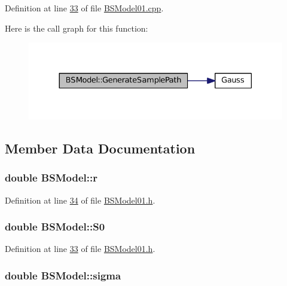 Definition at line \hyperlink{BSModel01_8cpp_source_l00033}{33} of file \hyperlink{BSModel01_8cpp_source}{B\+S\+Model01.\+cpp}.



Here is the call graph for this function\+:\nopagebreak
\begin{figure}[H]
\begin{center}
\leavevmode
\includegraphics[width=330pt]{classBSModel_aad0f0d6d1b9df4d76d03bd0b477e1347_cgraph}
\end{center}
\end{figure}




\subsection{Member Data Documentation}
\hypertarget{classBSModel_add3230c0df8e47623116b439598c0de3}{
\subsubsection[{r}]{\setlength{\rightskip}{0pt plus 5cm}double B\+S\+Model\+::r}}\label{classBSModel_add3230c0df8e47623116b439598c0de3}


Definition at line \hyperlink{BSModel01_8h_source_l00034}{34} of file \hyperlink{BSModel01_8h_source}{B\+S\+Model01.\+h}.

\hypertarget{classBSModel_a2b37a14d9aaab033d676dd16381f7f19}{
\subsubsection[{S0}]{\setlength{\rightskip}{0pt plus 5cm}double B\+S\+Model\+::\+S0}}\label{classBSModel_a2b37a14d9aaab033d676dd16381f7f19}


Definition at line \hyperlink{BSModel01_8h_source_l00033}{33} of file \hyperlink{BSModel01_8h_source}{B\+S\+Model01.\+h}.

\hypertarget{classBSModel_a1267641043c16cd9baf2eb242320f0d3}{
\subsubsection[{sigma}]{\setlength{\rightskip}{0pt plus 5cm}double B\+S\+Model\+::sigma}}\label{classBSModel_a1267641043c16cd9baf2eb242320f0d3}


